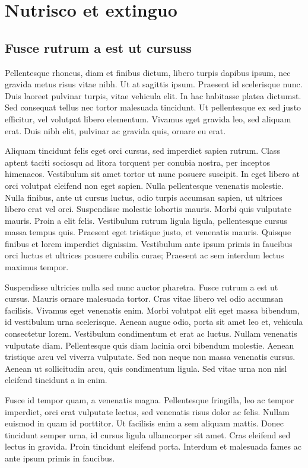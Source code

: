 \chapter{Nutrisco et extinguo}

\section{Fusce rutrum a est ut cursuss}
Pellentesque rhoncus, diam et finibus dictum, libero turpis dapibus ipsum, nec gravida metus risus vitae nibh. Ut at sagittis ipsum. Praesent id scelerisque nunc. Duis laoreet pulvinar turpis, vitae vehicula elit. In hac habitasse platea dictumst. Sed consequat tellus nec tortor malesuada tincidunt. Ut pellentesque ex sed justo efficitur, vel volutpat libero elementum. Vivamus eget gravida leo, sed aliquam erat. Duis nibh elit, pulvinar ac gravida quis, ornare eu erat.

Aliquam tincidunt felis eget orci cursus, sed imperdiet sapien rutrum. Class aptent taciti sociosqu ad litora torquent per conubia nostra, per inceptos himenaeos. Vestibulum sit amet tortor ut nunc posuere suscipit. In eget libero at orci volutpat eleifend non eget sapien. Nulla pellentesque venenatis molestie. Nulla finibus, ante ut cursus luctus, odio turpis accumsan sapien, ut ultrices libero erat vel orci. Suspendisse molestie lobortis mauris. Morbi quis vulputate mauris. Proin a elit felis. Vestibulum rutrum ligula ligula, pellentesque cursus massa tempus quis. Praesent eget tristique justo, et venenatis mauris. Quisque finibus et lorem imperdiet dignissim. Vestibulum ante ipsum primis in faucibus orci luctus et ultrices posuere cubilia curae; Praesent ac sem interdum lectus maximus tempor.

Suspendisse ultricies nulla sed nunc auctor pharetra. Fusce rutrum a est ut cursus. Mauris ornare malesuada tortor. Cras vitae libero vel odio accumsan facilisis. Vivamus eget venenatis enim. Morbi volutpat elit eget massa bibendum, id vestibulum urna scelerisque. Aenean augue odio, porta sit amet leo et, vehicula consectetur lorem. Vestibulum condimentum et erat ac luctus. Nullam venenatis vulputate diam. Pellentesque quis diam lacinia orci bibendum molestie. Aenean tristique arcu vel viverra vulputate. Sed non neque non massa venenatis cursus. Aenean ut sollicitudin arcu, quis condimentum ligula. Sed vitae urna non nisl eleifend tincidunt a in enim.

Fusce id tempor quam, a venenatis magna. Pellentesque fringilla, leo ac tempor imperdiet, orci erat vulputate lectus, sed venenatis risus dolor ac felis. Nullam euismod in quam id porttitor. Ut facilisis enim a sem aliquam mattis. Donec tincidunt semper urna, id cursus ligula ullamcorper sit amet. Cras eleifend sed lectus in gravida. Proin tincidunt eleifend porta. Interdum et malesuada fames ac ante ipsum primis in faucibus.


